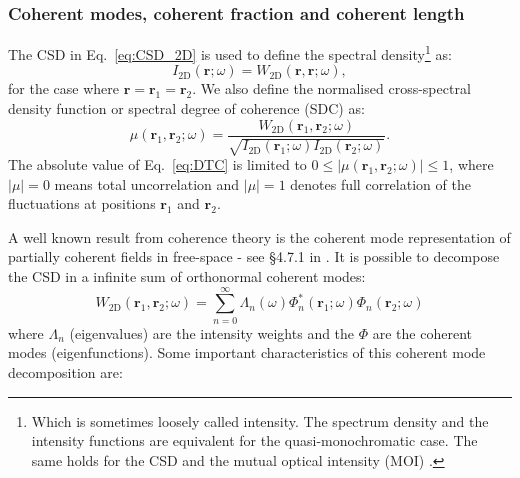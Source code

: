 \documentclass{iucr}              %
\begin{document}
\subsubsection{Coherent modes, coherent fraction and coherent length\\}

The CSD in Eq.~\ref{eq:CSD_2D} is used to define the spectral density\footnote{Which is sometimes loosely called intensity. The spectrum density and the intensity functions are equivalent for the quasi-monochromatic case. The same holds for the CSD and the mutual optical intensity (MOI) \cite{mandel_wolf}.} as:
\begin{equation}\label{eq:intensity}
    I_\text{2D}(\textbf{r};\omega)=W_\text{2D}(\textbf{r},\textbf{r};\omega),
\end{equation}
for the case where $\textbf{r}=\textbf{r}_1=\textbf{r}_2$. We also define the normalised cross-spectral density function or spectral degree of coherence (SDC) as:
\begin{equation}
\mu(\textbf{r}_1,\textbf{r}_2;\omega) = \frac{W_\text{2D}(\textbf{r}_1,\textbf{r}_2;\omega)}{\sqrt{I_\text{2D}(\textbf{r}_1;\omega) I_\text{2D}(\textbf{r}_2;\omega)}}.
\label{eq:DTC}
\end{equation}
The absolute value of Eq.~\ref{eq:DTC} is limited to $0\leq|\mu(\textbf{r}_1,\textbf{r}_2;\omega)|\leq 1$, where $|\mu|=0$ means total uncorrelation and $|\mu|=1$ denotes full correlation of the fluctuations at positions $\textbf{r}_1$ and $\textbf{r}_2$.

A well known result from coherence theory is the coherent mode representation of partially coherent fields in free-space - see §4.7.1 in \cite{mandel_wolf}. It is possible to decompose the CSD in a infinite sum of orthonormal coherent modes:
\begin{equation}\label{eq:W2DCMD}
W_\text{2D}(\textbf{r}_1,\textbf{r}_2;\omega) = \sum_{n=0}^{\infty} \Lambda_n(\omega) \Phi_{n}^*(\textbf{r}_1;\omega) \Phi_{n}(\textbf{r}_2;\omega)
\end{equation}
where $\Lambda_n$ (eigenvalues) are the intensity weights and the $\Phi$ are the coherent modes (eigenfunctions). 
Some important characteristics of this coherent mode decomposition are: 
\end{document}

